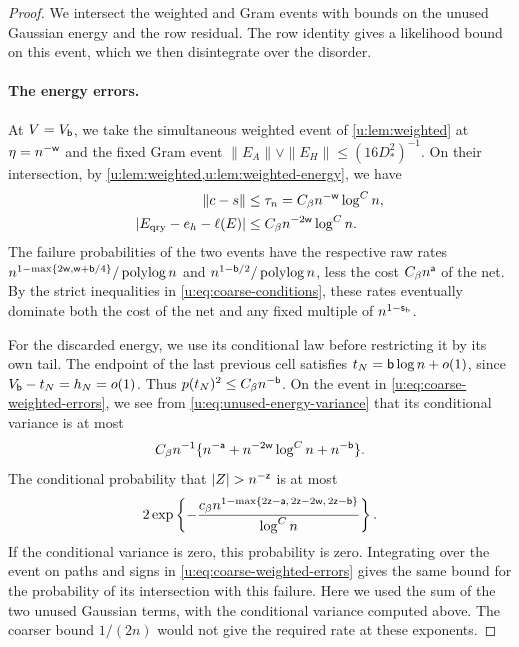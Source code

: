 \begin{proof}
We intersect the weighted and Gram events with bounds on the unused Gaussian energy and the row residual. The row identity gives a likelihood bound on this event, which we then disintegrate over the disorder.

\paragraph{The energy errors.}
At $V=V_{\mathsf{b}}$, we take the simultaneous weighted event of \cref{u:lem:weighted} at $\eta=n^{-\mathsf{w}}$ and the fixed Gram event $\|E_A\|\vee\|E_H\|\le(16D_*^2)^{-1}$. On their intersection, by \cref{u:lem:weighted,u:lem:weighted-energy}, we have
\begin{equation}\label{u:eq:coarse-weighted-errors}
\begin{aligned}
 \|c-s\|&\le\tau_n=C_\beta n^{-\mathsf{w}}\log^Cn,\\
 |E_{\rm qry}-e_h-\ell(E)|&\le C_\beta n^{-2\mathsf{w}}\log^Cn.
\end{aligned}
\end{equation}
The failure probabilities of the two events have the respective raw rates $n^{1-\max\{2\mathsf{w},\mathsf{w}+\mathsf{b}/4\}}/\operatorname{polylog}n$ and $n^{1-\mathsf{b}/2}/\operatorname{polylog}n$, less the cost $C_\beta n^{\mathsf{a}}$ of the net. By the strict inequalities in \eqref{u:eq:coarse-conditions}, these rates eventually dominate both the cost of the net and any fixed multiple of $n^{1-\mathsf{s}_{\rm b}}$.

For the discarded energy, we use its conditional law before restricting it by its own tail. The endpoint of the last previous cell satisfies $t_N=\mathsf{b}\log n+o(1)$, since $V_{\mathsf{b}}-t_N=h_N=o(1)$. Thus $p(t_N)^2\le C_\beta n^{-\mathsf{b}}$. On the event in \eqref{u:eq:coarse-weighted-errors}, we see from \eqref{u:eq:unused-energy-variance} that its conditional variance is at most
\[
 C_\beta n^{-1}\{n^{-\mathsf{a}}+n^{-2\mathsf{w}}\log^Cn+n^{-\mathsf{b}}\}.
\]
The conditional probability that $|Z|>n^{-\ex z}$ is at most
\begin{equation}\label{u:eq:coarse-gaussian-tail}
 2\exp\left\{-\frac{c_\beta
 n^{1-\max\{2\mathsf{z}-\mathsf{a},\,2\mathsf{z}-2\mathsf{w},\,2\mathsf{z}-\mathsf{b}\}}}
 {\log^Cn}\right\}.
\end{equation}
If the conditional variance is zero, this probability is zero. Integrating over the event on paths and signs in \eqref{u:eq:coarse-weighted-errors} gives the same bound for the probability of its intersection with this failure. Here we used the sum of the two unused Gaussian terms, with the conditional variance computed above. The coarser bound $1/(2n)$ would not give the required rate at these exponents.


\end{proof}
